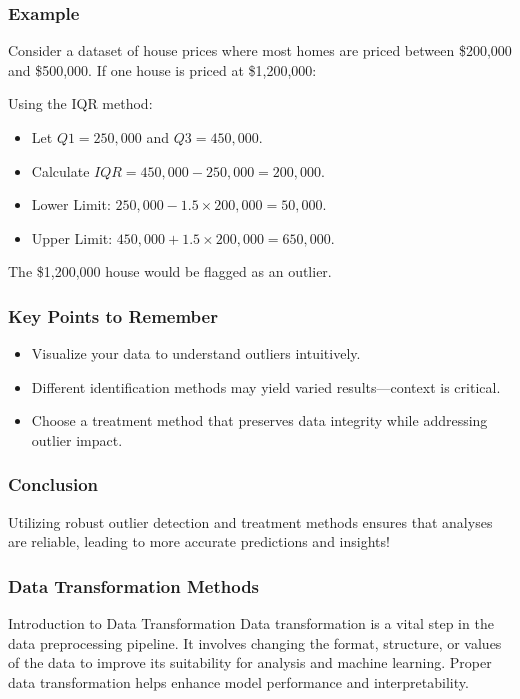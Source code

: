\documentclass[aspectratio=169]{beamer}
\begin{document}
\begin{frame}[fragile]
    \frametitle{Example}
    Consider a dataset of house prices where most homes are priced between \$200,000 and \$500,000. 
    If one house is priced at \$1,200,000:

    Using the IQR method:
    \begin{itemize}
        \item Let \( Q1 = 250,000 \) and \( Q3 = 450,000 \).
        \item Calculate \( IQR = 450,000 - 250,000 = 200,000 \).
        \item Lower Limit: \( 250,000 - 1.5 \times 200,000 = 50,000 \).
        \item Upper Limit: \( 450,000 + 1.5 \times 200,000 = 650,000 \).
    \end{itemize}
    The \$1,200,000 house would be flagged as an outlier.
\end{frame}

\begin{frame}[fragile]
    \frametitle{Key Points to Remember}
    \begin{itemize}
        \item Visualize your data to understand outliers intuitively.
        \item Different identification methods may yield varied results—context is critical.
        \item Choose a treatment method that preserves data integrity while addressing outlier impact.
    \end{itemize}
\end{frame}

\begin{frame}[fragile]
    \frametitle{Conclusion}
    Utilizing robust outlier detection and treatment methods ensures that analyses are reliable, leading to more accurate predictions and insights!
\end{frame}

\begin{frame}[fragile]
    \frametitle{Data Transformation Methods}
    \begin{block}{Introduction to Data Transformation}
        Data transformation is a vital step in the data preprocessing pipeline. It involves changing the format, structure, or values of the data to improve its suitability for analysis and machine learning. Proper data transformation helps enhance model performance and interpretability.
    \end{block}
\end{frame}
\end{document}

